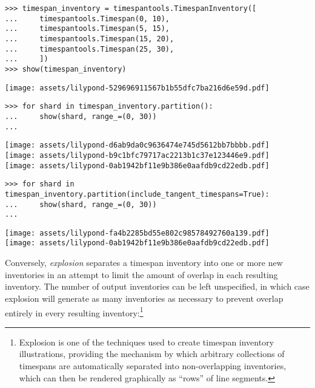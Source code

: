 \begin{singlespacing}
\vspace{-0.5\baselineskip}
\begin{lstlisting}
>>> timespan_inventory = timespantools.TimespanInventory([
...     timespantools.Timespan(0, 10),
...     timespantools.Timespan(5, 15),
...     timespantools.Timespan(15, 20),
...     timespantools.Timespan(25, 30),
...     ])
>>> show(timespan_inventory)
\end{lstlisting}
\noindent\texttt{[image: assets/lilypond-529696911567b1b55dfc7ba216d6e59d.pdf]}
\begin{lstlisting}
>>> for shard in timespan_inventory.partition():
...     show(shard, range_=(0, 30))
...
\end{lstlisting}
\noindent\texttt{[image: assets/lilypond-d6ab9da0c9636474e745d5612bb7bbbb.pdf]}\\
\noindent\texttt{[image: assets/lilypond-b9c1bfc79717ac2213b1c37e123446e9.pdf]}\\
\noindent\texttt{[image: assets/lilypond-0ab1942bf11e9b386e0aafdb9cd22edb.pdf]}
\begin{lstlisting}
>>> for shard in timespan_inventory.partition(include_tangent_timespans=True):
...     show(shard, range_=(0, 30))
...
\end{lstlisting}
\noindent\texttt{[image: assets/lilypond-fa4b2285bd55e802c98578492760a139.pdf]}\\
\noindent\texttt{[image: assets/lilypond-0ab1942bf11e9b386e0aafdb9cd22edb.pdf]}
\end{singlespacing}

\noindent Conversely, \emph{explosion} separates a timespan inventory into one
or more new inventories in an attempt to limit the amount of overlap in each
resulting inventory. The number of output inventories can be left unspecified,
in which case explosion will generate as many inventories as necessary to
prevent overlap entirely in every resulting inventory:\footnote{ Explosion is
one of the techniques used to create timespan inventory illustrations,
providing the mechanism by which arbitrary collections of timespans are
automatically separated into non-overlapping inventories, which can then be
rendered graphically as \enquote{rows} of line segments.}

\begin{comment}
<abjad>
timespan_inventory = timespantools.TimespanInventory([
    timespantools.Timespan(-2, 8),
    timespantools.Timespan(-2, 1),
    timespantools.Timespan(0, 16),
    timespantools.Timespan(4, 7),
    timespantools.Timespan(4, 11),
    timespantools.Timespan(5, 12),
    timespantools.Timespan(11, 13),
    timespantools.Timespan(14, 17),
    timespantools.Timespan(15, 20),
    ])
show(timespan_inventory)
for shard in timespan_inventory.explode():
    show(shard, range_=(-2, 20))

</abjad>
\end{comment}

